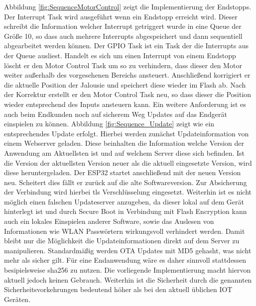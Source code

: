 Abbildung \ref{fig:SequenceMotorControl} zeigt die Implementierung der Endstopps. Der Interrupt Task wird ausgeführt wenn ein Endstopp erreicht wird. Dieser schreibt die Information welcher Interrupt getriggert wurde in eine Queue der Größe 10, so dass auch mehrere Interrupts abgespeichert und dann sequentiell abgearbeitet werden können. Der GPIO Task ist ein Task der die Interrupts aus der Queue ausliest. Handelt es sich um einen Interrupt von einem Endstopp löscht er den Motor Control Task um so zu verhindern, dass dieser den Motor weiter außerhalb des vorgesehenen Bereichs ansteuert. Anschließend korrigiert er die aktuelle Position der Jalousie und speichert diese wieder im Flash ab. Nach der Korrektur erstellt er den Motor Control Task neu, so dass dieser die Position wieder entsprechend des Inputs ansteuern kann. Ein weitere Anforderung ist es auch beim Endkunden noch auf sicherem Weg Updates auf das Endgerät einspielen zu können. Abbildung \ref{fig:Sequence_Update} zeigt wie ein entsprechendes Update erfolgt. Hierbei werden zunächst Updateinformation von einem Webserver geladen. Diese beinhalten die Information welche Version der Anwendung am Aktuellsten ist und auf welchem Server diese sich befinden. Ist die Version der aktuellsten Version neuer als die aktuell eingesetzte Version, wird diese heruntergeladen. Der ESP32 startet anschließend mit der neuen Version neu. Scheitert dies fällt er zurück auf die alte Softwareversion. Zur Absicherung der Verbindung wird hierbei tls Verschlüsselung eingesetzt. Weiterhin ist es nicht möglich einen falschen Updateserver anzugeben, da dieser lokal auf dem Gerät hinterlegt ist und durch Secure Boot in Verbindung mit Flash Encryption kann auch ein lokales Einspielen anderer Software, sowie das Auslesen von Informationen wie WLAN Passwörtern wirkungsvoll verhindert werden. Damit bleibt nur die Möglichkeit die Updateinformationen direkt auf dem Server zu manipulieren. Standardmäßig werden OTA Updates mit MD5 gehasht, was nicht mehr als sicher gilt. Für eine Endanwendung wäre es daher sinnvoll stattdessen besipielsweise sha256 zu nutzen. Die vorliegende Implementierung macht hiervon aktuell jedoch keinen Gebrauch. Weiterhin ist die Sicherheit durch die genannten Sicherheitsvorkehrungen bedeutend höher als bei den aktuell üblichen IOT Geräten.

